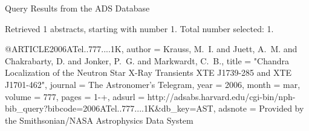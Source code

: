 Query Results from the ADS Database


Retrieved 1 abstracts, starting with number 1.  Total number selected: 1.

@ARTICLE{2006ATel..777....1K,
   author = {{Krauss}, M.~I. and {Juett}, A.~M. and {Chakrabarty}, D. and 
	{Jonker}, P.~G. and {Markwardt}, C.~B.},
    title = "{Chandra Localization of the Neutron Star X-Ray Transients XTE J1739-285 and XTE J1701-462}",
  journal = {The Astronomer's Telegram},
     year = 2006,
    month = mar,
   volume = 777,
    pages = {1-+},
   adsurl = {http://adsabs.harvard.edu/cgi-bin/nph-bib_query?bibcode=2006ATel..777....1K&db_key=AST},
  adsnote = {Provided by the Smithsonian/NASA Astrophysics Data System}
}


